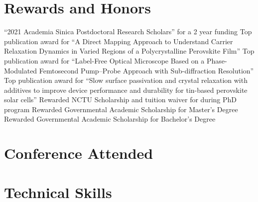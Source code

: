 \documentclass[11pt,a4paper]{moderncv}
\begin{document}
\section{Rewards and Honors}
        {``2021 Academia Sinica Postdoctoral 
        Research Scholars'' for a 2 year funding}
        {Top publication award for ``A Direct Mapping 
        Approach to Understand Carrier Relaxation 
        Dynamics in Varied Regions of a 
        Polycrystalline Perovskite Film''}
        {Top publication award for ``Label-Free Optical 
        Microscope Based on a Phase-Modulated Femtosecond 
        Pump–Probe Approach with Sub-diffraction Resolution''}
        {Top publication award for ``Slow surface 
        passivation and crystal relaxation with additives to 
        improve device performance and durability for tin-based 
        perovskite solar cells''}
        {Rewarded NCTU Scholarship and tuition waiver 
        for during PhD program}
        {Rewarded Governmental Academic Scholarship 
        for Master's Degree}
        {Rewarded Governmental Academic Scholarship 
        for Bachelor's Degree}
\section{Conference Attended}
\section{Technical Skills}
\end{document}
